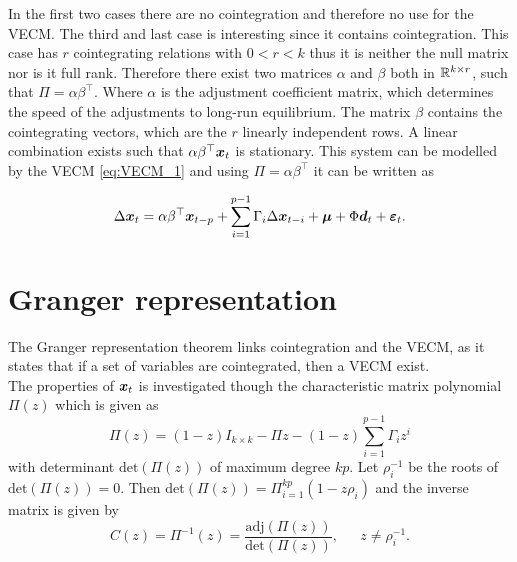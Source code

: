 In the first two cases there are no cointegration and therefore no use for the VECM. The third and last case is interesting since it contains cointegration. This case has $r$ cointegrating relations with $0<r<k$ thus it is neither the null matrix nor is it full rank. Therefore there exist two matrices $\alpha$ and $\beta$ both in $\mathbb{R}^{k\times r}$, such that $\Pi=\alpha \beta^\top$. Where $\alpha$ is the adjustment coefficient matrix, which determines the speed of the adjustments to long-run equilibrium. The matrix $\beta$ contains the cointegrating vectors, which are the $r$ linearly independent rows. A linear combination exists such that $\alpha\beta^\top \boldsymbol{x}_t$ is stationary. This system can be modelled by the VECM \eqref{eq:VECM_1} and using $\Pi=\alpha\beta^\top$ it can be written as

\begin{equation}
\Delta \boldsymbol{x}_t = \alpha\beta^\top \boldsymbol{x}_{t-p} + \sum_{i=1}^{p-1}\Gamma_i\Delta \boldsymbol{x}_{t-i} + \boldsymbol{\mu} + \Phi \boldsymbol{d}_t + \boldsymbol{\varepsilon}_t.
    \label{eq:VECM_2}
\end{equation}
\section{Granger representation}

\noindent The Granger representation theorem links cointegration and the VECM, as it states that if a set of variables are cointegrated, then a VECM exist.\\
%
\noindent The properties of $\boldsymbol{x}_t$ is investigated though the characteristic matrix polynomial $\Pi(z)$ which is given as 
\begin{equation*}
    \Pi(z)=(1-z)I_{k\times k}-\Pi z-(1-z)\sum_{i=1}^{p-1}\Gamma_i z^i
\end{equation*}
\noindent with determinant $\text{det}(\Pi(z)) $ of maximum degree $kp$. Let $\rho^{-1}_i$ be the roots of $\text{det}(\Pi(z)) = 0$. Then $\text{det}(\Pi(z)) = \Pi^{kp}_{i=1}(1-z \rho_i)$ and the inverse matrix is given by 
\begin{equation*}
    C(z)=\Pi^{-1}(z)=\frac{\text{adj}(\Pi(z))}{\text{det}(\Pi(z))}, \phantom{asd} z\neq \rho^{-1}_i.
\end{equation*}

